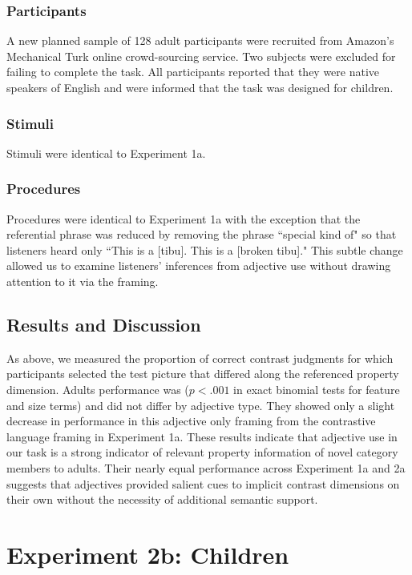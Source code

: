\documentclass[10pt,letterpaper]{article}
\begin{document}
\subsubsection{Participants}

A new planned sample of 128 adult participants were recruited from Amazon's Mechanical Turk online crowd-sourcing service.  Two subjects were excluded for failing to complete the task. All participants reported that they were native speakers of English and were informed that the task was designed for children.  

\subsubsection{Stimuli}

Stimuli were identical to Experiment 1a. 

\subsubsection{Procedures}

Procedures were identical to Experiment 1a with the exception that the referential phrase was reduced by removing the phrase ``special kind of" so that listeners heard only ``This is a [tibu]. This is a [broken tibu]."   This subtle change allowed us to examine listeners' inferences from adjective use without drawing attention to it via the framing.  

\subsection{Results and Discussion}

As above, we measured the proportion of correct contrast judgments for which participants selected the test picture that differed along the referenced property dimension.  Adults performance was ($p < .001$ in exact binomial tests for feature and size terms) and did not differ by adjective type.  They showed only a slight decrease in performance in this adjective only framing from the contrastive language framing in Experiment 1a.  These results indicate that adjective use in our task is a strong indicator of relevant property information of novel category members to adults.  Their nearly equal performance across Experiment 1a and 2a suggests that adjectives provided salient cues to implicit contrast dimensions on their own without the necessity of additional semantic support. 

\section{Experiment 2b: Children} 
\end{document}
